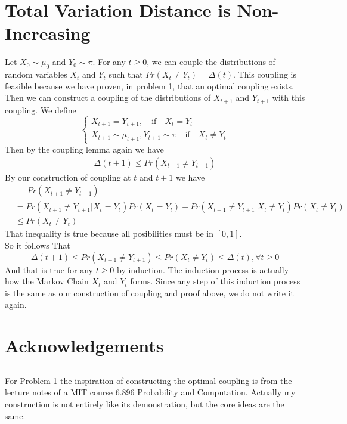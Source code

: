 \documentclass[12pt,letterpaper]{article}
\begin{document}
\section{Total Variation Distance is Non-Increasing}
Let $X_0\sim\mu_0$ and $Y_0\sim\pi$. For any $t\geq 0$, we can couple the distributions of random variables $X_t$ and $Y_t$ such that $Pr(X_t\neq Y_t)=\Delta(t)$. This coupling is feasible because we have proven, in problem 1, that an optimal coupling exists.\\
Then we can construct a coupling of the distributions of  $X_{t+1}$ and $Y_{t+1}$ with this coupling. We define 
$$\begin{cases}
  X_{t+1}=Y_{t+1},\quad \text{if} \quad X_t=Y_t\\
  X_{t+1}\sim\mu_{t+1}, Y_{t+1}\sim\pi \quad \text{if} \quad X_t\neq Y_t
\end{cases}$$
Then by the coupling lemma again we have 
\begin{align}
  \Delta(t+1)\leq Pr(X_{t+1}\neq Y_{t+1})
\end{align}
By our construction of coupling at $t$ and $t+1$ we have
\begin{align}
  &\quad\enspace  Pr(X_{t+1}\neq Y_{t+1})\\
  &=Pr(X_{t+1}\neq Y_{t+1}|X_t=Y_t)Pr(X_t=Y_t)+Pr(X_{t+1}\neq Y_{t+1}|X_t\neq Y_t)Pr(X_t\neq Y_t)\\
  &\leq Pr(X_t\neq Y_t)
\end{align} 
That inequality is true because all posibilities must be in $[0,1]$.\\
So it follows That
$$\Delta(t+1)\leq Pr(X_{t+1}\neq Y_{t+1})\leq Pr(X_t\neq Y_t)\leq\Delta(t),\forall t\geq 0$$
And that is true for any $t\geq 0$ by induction. The induction process is actually how the Markov Chain $X_t$ and $Y_t$ forms. Since any step of this induction process is the same as our construction of coupling and proof above, we do not write it again.

\newpage
\section{Acknowledgements}
\subsection{}
For Problem 1 the inspiration of constructing the optimal coupling is from the lecture notes of a MIT course 6.896 Probability and Computation.
Actually my construction is not entirely like its demonstration, but the core ideas are the same.\\
\end{document}
